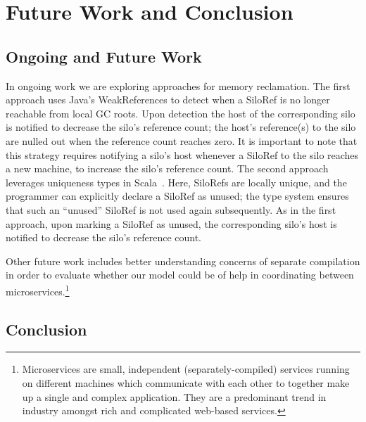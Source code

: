 \documentclass{jfp1}
\begin{document}


\section{Future Work and Conclusion}
\label{sec:conclusion-future-work}

\subsection{Ongoing and Future Work}

In ongoing work we are exploring approaches for memory reclamation. The first
approach uses Java's WeakReferences to detect when a SiloRef is no longer
reachable from local GC roots. Upon detection the host of the corresponding silo
is notified to decrease the silo's reference count; the host's reference(s) to
the silo are nulled out when the reference count reaches zero. It is important
to note that this strategy requires notifying a silo's host whenever a SiloRef
to the silo reaches a new machine, to increase the silo's reference count. The
second approach leverages uniqueness types in Scala~\cite{Uniqueness,HallerL16}. Here,
SiloRefs are locally unique, and the programmer can explicitly declare a SiloRef
as unused; the type system ensures that such an ``unused'' SiloRef is not used
again subsequently. As in the first approach, upon marking a SiloRef as unused,
the corresponding silo's host is notified to decrease the silo's reference
count.

Other future work includes better understanding concerns of separate compilation
in order to evaluate whether our model could be of help in coordinating between
microservices.\footnote{Microservices are small, independent
(separately-compiled) services running on different machines which communicate
with each other to together make up a single and complex application. They are a
predominant trend in industry amongst rich and complicated web-based services.}

\subsection{Conclusion}
\end{document}

